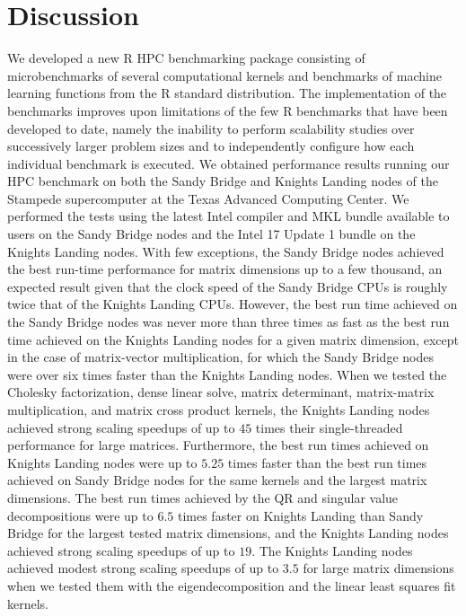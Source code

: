 \section{Discussion} \label{sec:discuss}
We developed a new R HPC benchmarking package consisting of microbenchmarks of
  several computational kernels and benchmarks of machine learning functions
  from the R standard distribution.
The implementation of the benchmarks improves upon limitations of the few R
  benchmarks that have been developed to date, namely the inability to perform
  scalability studies over successively larger problem sizes and to
  independently configure how each individual benchmark is executed.
We obtained performance results running our HPC benchmark on both the Sandy
  Bridge and Knights Landing nodes of the Stampede supercomputer at the Texas
  Advanced Computing Center.
We performed the tests using the latest Intel compiler and MKL bundle available
  to users on the Sandy Bridge nodes and the Intel 17 Update 1 bundle on the
  Knights Landing nodes.
With few exceptions, the Sandy Bridge nodes achieved the best run-time
  performance for matrix dimensions up to a few thousand, an expected result
  given that the clock speed of the Sandy Bridge CPUs is roughly twice that of
  the Knights Landing CPUs.
However, the best run time achieved on the Sandy Bridge nodes was never more
  than three times as fast as the best run time achieved on the Knights Landing
  nodes for a given matrix dimension, except in the case of matrix-vector
  multiplication, for which the Sandy Bridge nodes were over six times faster
  than the Knights Landing nodes.
When we tested the Cholesky factorization, dense linear solve, matrix
  determinant, matrix-matrix multiplication, and matrix cross product kernels,
  the Knights Landing nodes achieved strong scaling speedups of up to $45$ times
  their single-threaded performance for large matrices.
Furthermore, the best run times achieved on Knights Landing nodes were up to
  $5.25$ times faster than the best run times achieved on Sandy Bridge nodes for
  the same kernels and the largest matrix dimensions.
The best run times achieved by the QR and singular value decompositions were up
  to $6.5$ times faster on Knights Landing than Sandy Bridge for the largest
  tested matrix dimensions, and the Knights Landing nodes achieved strong
  scaling speedups of up to $19$.
The Knights Landing nodes achieved modest strong scaling speedups of up to $3.5$
  for large matrix dimensions when we tested them with the eigendecomposition
  and the linear least squares fit kernels.
